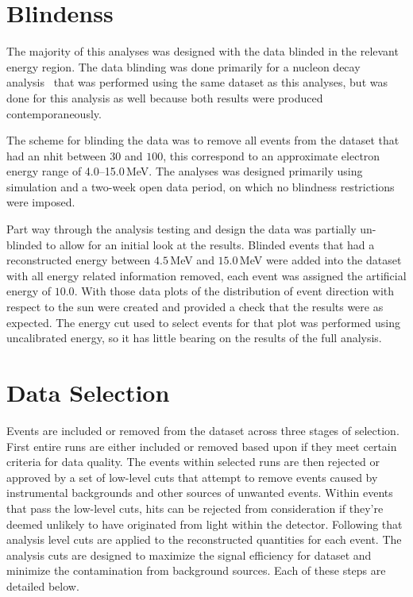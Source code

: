 \section{Blindenss}
The majority of this analyses was designed with the data blinded in the
relevant energy region.
The data blinding was done primarily for a nucleon decay analysis~\cite{ND_PAPER}
that was performed using the same dataset as this analyses, but was done
for this analysis as well because both results were produced contemporaneously.

The scheme for blinding the data was to remove all events from the dataset that
had an nhit between $30$ and $100$, this correspond to an approximate electron energy
range of \numrange{4.0}{15.0}\,MeV.
The analyses was designed primarily using simulation and a two-week open
data period, on which no blindness restrictions were imposed.

Part way through the analysis testing and design the data was partially un-blinded
to allow for an initial look at the results.
Blinded events that had a reconstructed energy between $4.5$\,MeV and $15.0$\,MeV
were added into the dataset with all energy related information removed,
each event was assigned the artificial energy of $10.0$\MeV.
With those data plots of the distribution of event direction with respect to
the sun were created and provided a check that the results were as expected.
The energy cut used to select events for that plot was performed using
uncalibrated energy, so it has little bearing on the results of the full
analysis.

\section{Data Selection}
Events are included or removed from the dataset across three stages of selection.
First entire runs are either included or removed based upon if they meet
certain criteria for data quality.
The events within selected runs are then rejected or approved by a set
of low-level cuts that attempt to remove events caused by instrumental
backgrounds and other sources of unwanted events.
Within events that pass the low-level cuts, hits can be rejected from consideration
if they're deemed unlikely to have originated from light within the detector.
Following that analysis level cuts are applied to the reconstructed quantities
for each event.
The analysis cuts are designed to maximize the signal efficiency for dataset and minimize the
contamination from background sources.
Each of these steps are detailed below.

